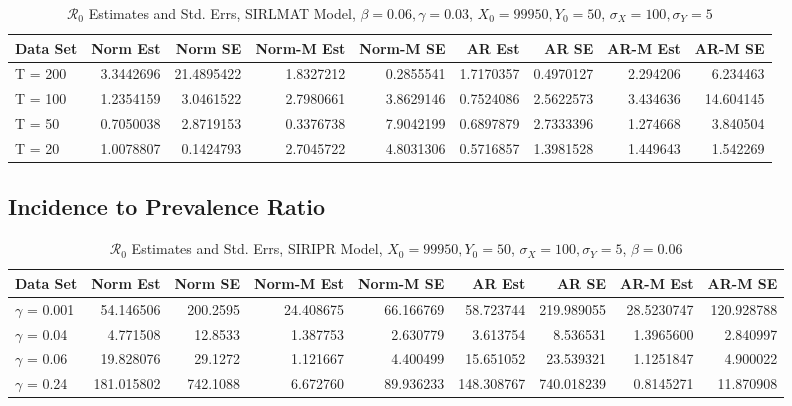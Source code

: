 \message{ !name(draft_v13.tex)}\documentclass[12pt]{article}
\newcommand{\rr}{\ensuremath{\mathcal{R}_0}}
\begin{document}
\begin{table}[H]
	
	\caption{\label{tab:}$\rr$ Estimates and Std. Errs, SIRLMAT Model,
		$\beta = 0.06, \gamma = 0.03$, $X_0 = 99950, Y_0 = 50$, $\sigma_X = 100, \sigma_Y = 5$}
	\centering
	\begin{tabular}[t]{l|r|r|r|r|r|r|r|r}
		\hline
		Data Set & Norm Est & Norm SE & Norm-M Est & Norm-M SE & AR Est & AR SE & AR-M Est & AR-M SE\\
		\hline
		T = 200 & 3.3442696 & 21.4895422 & 1.8327212 & 0.2855541 & 1.7170357 & 0.4970127 & 2.294206 & 6.234463\\
		\hline
		T = 100 & 1.2354159 & 3.0461522 & 2.7980661 & 3.8629146 & 0.7524086 & 2.5622573 & 3.434636 & 14.604145\\
		\hline
		T = 50 & 0.7050038 & 2.8719153 & 0.3376738 & 7.9042199 & 0.6897879 & 2.7333396 & 1.274668 & 3.840504\\
		\hline
		T = 20 & 1.0078807 & 0.1424793 & 2.7045722 & 4.8031306 & 0.5716857 & 1.3981528 & 1.449643 & 1.542269\\
		\hline
	\end{tabular}
\end{table}

\subsection{Incidence to Prevalence Ratio}

\begin{table}[H]
	
	\caption{\label{tab:}$\rr$ Estimates and Std. Errs, SIRIPR Model,
		$X_0 = 99950, Y_0 = 50$, $\sigma_X = 100, \sigma_Y = 5$, $\beta = 0.06$}
	\centering
	\begin{footnotesize}
		\begin{tabular}[t]{l|r|r|r|r|r|r|r|r}
			\hline
			Data Set & Norm Est & Norm SE & Norm-M Est & Norm-M SE & AR Est & AR SE & AR-M Est & AR-M SE\\
			\hline
			$\gamma$ = 0.001 & 54.146506 & 200.2595 & 24.408675 & 66.166769 & 58.723744 & 219.989055 & 28.5230747 & 120.928788\\
			\hline
			$\gamma$ = 0.04 & 4.771508 & 12.8533 & 1.387753 & 2.630779 & 3.613754 & 8.536531 & 1.3965600 & 2.840997\\
			\hline
			$\gamma$ = 0.06 & 19.828076 & 29.1272 & 1.121667 & 4.400499 & 15.651052 & 23.539321 & 1.1251847 & 4.900022\\
			\hline
			$\gamma$ = 0.24 & 181.015802 & 742.1088 & 6.672760 & 89.936233 & 148.308767 & 740.018239 & 0.8145271 & 11.870908\\
			\hline
		\end{tabular}
	\end{footnotesize}
\end{table}
\end{document}
